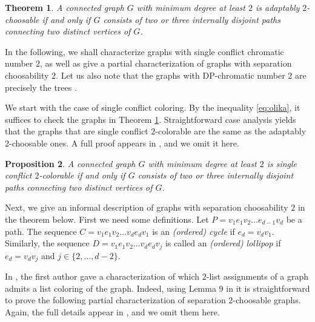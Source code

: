 \documentclass[12pt]{article}
\newtheorem{theorem}{Theorem}[section]
\newtheorem{proposition}[theorem]{Proposition}
\begin{document}
\begin{theorem}
\label{th:2adapted} \cite{KostochkaZhu}
	A connected graph $G$ with minimum degree at least $2$ is adaptably 
	$2$-choosable if and only if $G$ consists 	
	of two or three internally disjoint paths connecting two distinct vertices of $G$.
\end{theorem}



	In the following, we shall characterize graphs with single conflict chromatic
	number $2$, as well as give a partial characterization of graphs with separation choosability $2$.
	Let us also note that the graphs with DP-chromatic number $2$ are precisely the
	trees \cite{Abe}.

	We start with the case of single conflict coloring.
	By the inequality \eqref{eq:olika}, it suffices to check the graphs 
	in Theorem \ref{th:2adapted}. Straightforward case analysis
	yields that the graphs that are single conflict $2$-colorable are the same as the 
	adaptably $2$-choosable ones.
	A full proof appears in \cite{Eriksson}, and we omit it here.

\begin{proposition}
\label{prop:singconf2}
	A connected graph $G$ with minimum degree at least $2$ is single conflict 
	$2$-colorable if and only if $G$ consists 	
	of two or three internally disjoint paths connecting two distinct vertices of $G$.
\end{proposition}

	
	Next, we give an informal description of graphs 
        with separation choosability $2$ in the  theorem below. 
	First we need some definitions.
	Let $P = v_1 e_1 v_2 \dots e_{d-1} v_d$ be a path.
	The sequence $C = v_1 e_1 v_2 \dots v_d e_d v_1$ is an
	{\em (ordered) cycle} if $e_d = v_d v_1$.
	Similarly, the sequence $D = v_1 e_1 v_2 \dots v_d e_d v_j$
	is called an {\em (ordered) lollipop} if $e_d = v_d v_j$
	and $j \in \{2, \dots , d-2\}$.


	In \cite{Casselgren2}, the first author gave a characterization of which $2$-list assignments
	of a graph admits a list coloring of the graph.
	Indeed, using Lemma 9 in \cite{Casselgren2} it is straightforward to prove the following partial characterization of
	separation $2$-choosable graphs. Again, the full details appear in \cite{Eriksson},
	and we omit them here.
\end{document}
